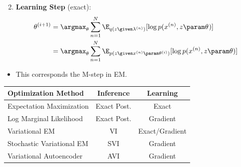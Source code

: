 \begin{frame}
\begin{center}
\end{center}

\begin{enumerate}
 \setcounter{enumi}{1}
    \item \textbf{Learning Step} (exact): 
        \begin{align*}
            \theta^{(i+1)} 
            &= \argmax_\theta \sum_{n=1}^N \E_{q(z \given \lambda^{(n)})}[\log p(x^{(n)}, z \param \theta^{})]  \\
            &= \argmax_\theta \sum_{n=1}^N \E_{p(z \given x^{(n)} \param \theta^{(i)})}[\log p(x^{(n)}, z \param \theta)] 
        \end{align*} 
\end{enumerate}
\begin{itemize}
    \item This corresponds the M-step in EM.
\end{itemize}
\end{frame}

\begin{frame}
\vspace{-3mm}
\begin{table}[]
    \centering
    \begin{tabular}{l c c }
    \toprule
        Optimization Method  & Inference & Learning \\
    \midrule
         Expectation Maximization & Exact Post. & Exact \\
         {\color{white} Log Marginal Likelihood} & {\color{white} Exact Post.} & {\color{white} Gradient} \\
         {\color{white} Variational EM} & {\color{white} VI} & {\color{white} Exact/Gradient} \\
         {\color{white} Stochastic Variational EM} & {\color{white} SVI} & {\color{white} Gradient}\\
         {\color{white} Variational Autoencoder} & {\color{white} AVI} & {\color{white} Gradient} \\
         \bottomrule
    \end{tabular}
\end{table}
\end{frame}

